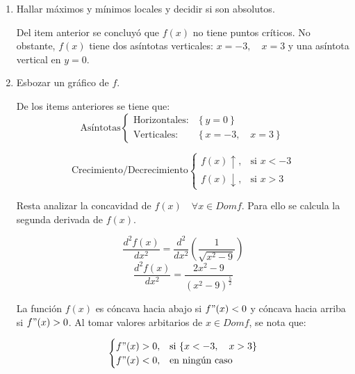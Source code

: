 \documentclass{article}
\begin{document}
\begin{enumerate}
\begin{enumerate}
        \item Hallar máximos y mínimos locales y decidir si son absolutos.
      
        Del item anterior se concluyó que $f(x)$ no tiene puntos críticos. No obstante, $f(x)$ tiene dos asíntotas verticales: $x=-3, \quad x=3$ y una asíntota vertical en $y=0$.
      
        \item Esbozar un gráfico de $f$.
      
        De los items anteriores se tiene que:
        \begin{equation*}
            \text{Asíntotas}\begin{cases}
                \text{Horizontales}: & \left\{ \text{$y=0$} \right\}\\
                \text{Verticales}: & \left\{ \text{$x=-3, \quad x=3$} \right\}
            \end{cases}
        \end{equation*}
        
        \begin{equation*}
            \text{Crecimiento/Decrecimiento}\begin{cases}
            \text{$f(x) \uparrow$}, & \text{si $x<-3$} \\ 
            \text{$f(x) \downarrow$}, & \text{si $x>3$}
            \end{cases}
        \end{equation*}
        
        Resta analizar la concavidad de $f(x) \quad \forall x \in Domf$. Para ello se calcula la segunda derivada de $f(x)$.
        
        $$\frac{d^2f(x)}{dx^2} = \frac{d^2}{dx^2} \left(\frac{1}{\sqrt{x^2-9}} \right)$$
        $$\frac{d^2f(x)}{dx^2} = \frac{2x^2 - 9}{(x^2 -9)^{\frac{5}{2}}}$$
        
        La función $f(x)$ es cóncava hacia abajo si $f"(x) < 0$ y cóncava hacia arriba si $f"(x) > 0$. Al tomar valores arbitarios de $x \in Domf$, se nota que:
        
        \begin{equation*}
            \begin{cases}
                \text{$f"(x)>0$}, & \text{si \{$x<-3, \quad x>3\}$} \\
                \text{$f"(x) < 0$}, & \text{en ningún caso}
            \end{cases}
        \end{equation*}
        

\end{enumerate}
\end{enumerate}
\end{document}
